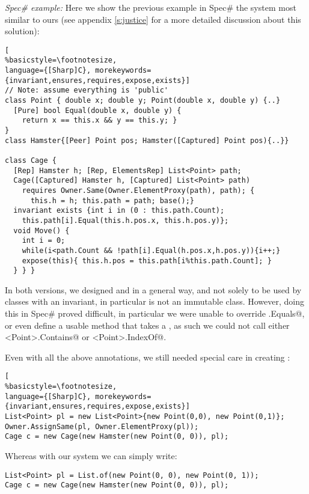 \textit{Spec\# example:} Here we show the previous example in Spec\# the system most similar to ours (see appendix \ref{s:justice} for a more detailed discussion about this solution):
\begin{lstlisting}[
%basicstyle=\footnotesize,
language={[Sharp]C}, morekeywords={invariant,ensures,requires,expose,exists}]
// Note: assume everything is 'public'
class Point { double x; double y; Point(double x, double y) {..}
  [Pure] bool Equal(double x, double y) {
    return x == this.x && y == this.y; }
}
class Hamster{[Peer] Point pos; Hamster([Captured] Point pos){..}}

class Cage {
  [Rep] Hamster h; [Rep, ElementsRep] List<Point> path;
  Cage([Captured] Hamster h, [Captured] List<Point> path)
    requires Owner.Same(Owner.ElementProxy(path), path); {
      this.h = h; this.path = path; base();}
  invariant exists {int i in (0 : this.path.Count);
    this.path[i].Equal(this.h.pos.x, this.h.pos.y)};
  void Move() {
    int i = 0;
    while(i<path.Count && !path[i].Equal(h.pos.x,h.pos.y)){i++;}
    expose(this){ this.h.pos = this.path[i%this.path.Count]; }
  } } }
\end{lstlisting}
In both versions, we designed \Q@Point@ and \Q@Hamster@ in a general way, and not solely to be used by classes with an invariant, in particular \Q@Point@ is not an immutable class. However, doing this in Spec\# proved difficult, in particular we were unable to override \Q@Object.Equals@, or even define a usable \Q@equals@ method that takes a \Q@Point@, as such we could not call either \Q@List<Point>.Contains@ or \Q@List<Point>.IndexOf@.
 
\noindent Even with all the above annotations, we still needed special care in creating \Q@Cage@s:
\begin{lstlisting}[
%basicstyle=\footnotesize,
language={[Sharp]C}, morekeywords={invariant,ensures,requires,expose,exists}]
List<Point> pl = new List<Point>{new Point(0,0), new Point(0,1)};
Owner.AssignSame(pl, Owner.ElementProxy(pl));
Cage c = new Cage(new Hamster(new Point(0, 0)), pl);
\end{lstlisting}
Whereas with our system we can simply write:
\begin{lstlisting}
List<Point> pl = List.of(new Point(0, 0), new Point(0, 1));
Cage c = new Cage(new Hamster(new Point(0, 0)), pl);
\end{lstlisting}

